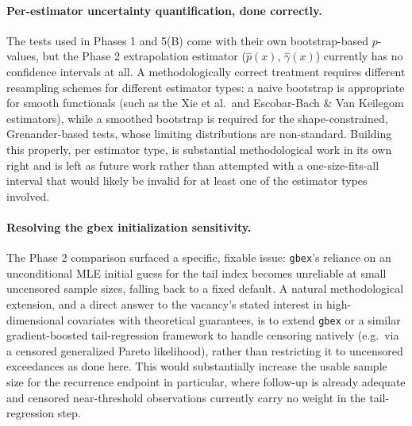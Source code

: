 \documentclass[11pt]{article}
\begin{document}
\paragraph{Per-estimator uncertainty quantification, done correctly.} The tests
used in Phases 1 and 5(B) come with their own bootstrap-based $p$-values, but the
Phase 2 extrapolation estimator ($\hat p(x)$, $\hat\gamma(x)$) currently has no
confidence intervals at all. A methodologically correct treatment requires
different resampling schemes for different estimator types: a naive bootstrap is
appropriate for smooth functionals (such as the Xie et al.\ and Escobar-Bach \&
Van Keilegom estimators), while a smoothed bootstrap is required for the
shape-constrained, Grenander-based tests, whose limiting distributions are
non-standard. Building this properly, per estimator type, is substantial
methodological work in its own right and is left as future work rather than
attempted with a one-size-fits-all interval that would likely be invalid for at
least one of the estimator types involved.

\paragraph{Resolving the gbex initialization sensitivity.} The Phase 2 comparison
surfaced a specific, fixable issue: \texttt{gbex}'s reliance on an unconditional
MLE initial guess for the tail index becomes unreliable at small uncensored sample
sizes, falling back to a fixed default. A natural methodological
extension, and a direct answer to the vacancy's stated interest in
high-dimensional covariates with theoretical guarantees, is to extend
\texttt{gbex} or a similar gradient-boosted tail-regression framework to handle
censoring natively (e.g.\ via a censored generalized Pareto likelihood), rather
than restricting it to uncensored exceedances as done here. This would substantially
increase the usable sample size for the recurrence endpoint in particular, where
follow-up is already adequate and censored near-threshold observations currently
carry no weight in the tail-regression step.
\end{document}
